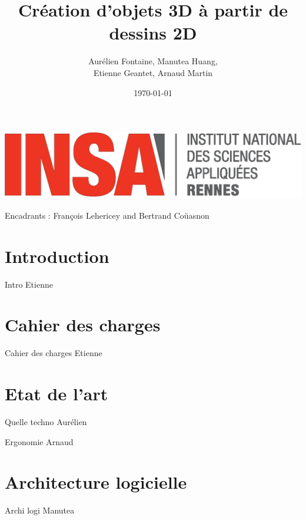 \documentclass[a4paper,10pt]{beamer}
\title{Création d'objets 3D à partir de dessins 2D}
\author[Groupe 3INFO]{Aurélien Fontaine, Manutea Huang,
\\ Etienne Geantet, Arnaud Martin}
\institute[INSA de Rennes]{Institut National des Sciences Appliquées de Rennes}
\date{\today}
\begin{document}
	
	\begin{frame}
		\begin{titlepage}
			\centerline{\includegraphics[scale=0.1]{images/logos/logoINSA.jpg}}
			\centerline{Encadrants : François Lehericey and Bertrand Coüasnon}	
		\end{titlepage}
	\end{frame}
	
	\section{Introduction}
	
	\begin{frame}
		Intro Etienne 
	\end{frame}
	
	\begin{frame}
		\tableofcontents
	\end{frame}
	
	\section{Cahier des charges}
	
	\begin{frame}
		Cahier des charges Etienne 
	\end{frame}
	
	\section{Etat de l'art}
	
	\begin{frame}
		Quelle techno Aurélien
	\end{frame}
		
	\begin{frame}
		Ergonomie Arnaud
	\end{frame}	
	
	\section{Architecture logicielle}	
	
	\begin{frame}
		Archi logi Manutea
	\end{frame}	
	
\end{document}
